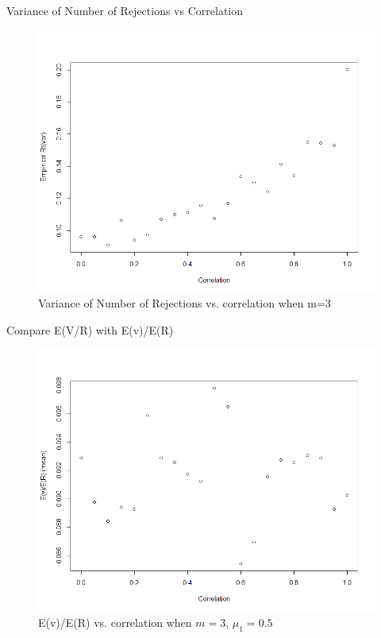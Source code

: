 \documentclass{beamer}
\begin{document}
\begin{frame}[t]{Variance of Number of Rejections vs Correlation}\vspace{10pt}

\begin{figure}[h]
	\centering
	\includegraphics[scale=0.35]{rtVarVSrho_m=3}
	\caption{\footnotesize{Variance of Number of Rejections vs. correlation when m=3}}
	\label{fig4}
\end{figure}

\end{frame}


\begin{frame}[t]{Compare E(V/R) with E(v)/E(R)}\vspace{10pt}

\begin{figure}[h]
	\centering
	\includegraphics[scale=0.35]{EvEr_m=3_1}
	\caption{\footnotesize{E(v)/E(R) vs. correlation when $m=3$, $\mu_1=0.5$}}
	\label{fig5}
\end{figure}

\end{frame}
\end{document}
